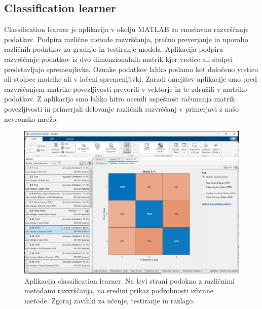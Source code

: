 \subsection{Classification learner}
Classification learner je aplikacija v okolju MATLAB za enostavno razvrščanje podatkov. Podpira različne metode razvrščanja, prečno preverjanje in uporabo različnih podatkov za gradnjo in testiranje modela. Aplikacija podpira razvrščanje podatkov iz dvo dimenzionalnih matrik kjer vrstice ali stolpci predstavljajo spremenjlivke. Oznake podatkov lahko podamo kot določeno vrstico ali stolpec matrike ali v ločeni spremenljivki. Zaradi omejitev aplikacije smo pred razvrščanjem matrike povezljivosti prevorili v vektorje in te združili v matriko podatkov. Z aplikacijo smo lahko hitro ocenili uspešnost računanja matrik povezljivosti in primerjali delovanje različnih razvrščanj v primerjavi z našo nevronsko mrežo.
\begin{figure}[h!]
    \begin{center}
    \includegraphics[width=1\linewidth]{slike/ClasificationLearner.png}
    \end{center}
    \caption{Aplikacija classification learner. Na levi strani podokno z različnimi metodami razvrščanja, na sredini prikaz podrobnosti izbrane metode. Zgoraj zavihki za učenje, testiranje in razlago. }
    \end{figure}

